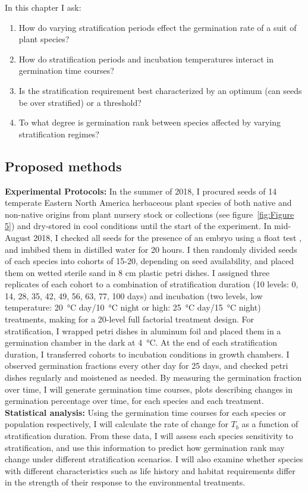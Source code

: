 \documentclass[12pt]{article}\usepackage[]{graphicx}\usepackage[]{color}
\begin{document}
\indent In this chapter I ask:
\begin{enumerate}
\item How do varying stratification periods effect the germination rate of a suit of plant species? 
\item How do stratification periods and incubation temperatures interact in germination time courses?
\item Is the stratification requirement best characterized by an optimum (can seeds be over stratified) or a threshold?
\item To what degree is germination rank between species affected by varying stratification regimes?
\end{enumerate}
\subsection*{Proposed methods}
\indent\indent\textbf{Experimental Protocols:} In the summer of 2018, I procured seeds of 14 temperate Eastern North America herbaceous plant species of both native and non-native origins from plant nursery stock or collections (see figure~\ref{fig:Figure 5}) and dry-stored in cool conditions until the start of the experiment. In mid-August 2018, I checked all seeds for the presence of an embryo using a float test \citep{Baskin2014}, and imbibed them in distilled water for 20 hours. I then randomly divided seeds of each species into cohorts of 15-20, depending on seed availability, and placed them on wetted sterile sand in 8 cm plastic petri dishes. I assigned three replicates of each cohort to a combination of stratification duration (10 levels: 0, 14, 28, 35, 42, 49, 56, 63, 77, 100 days) and incubation (two levels, low temperature: \SI{20}{\degreeCelsius} day/\SI{10}{\degreeCelsius} night or high: \SI{25}{\degreeCelsius} day/\SI{15}{\degreeCelsius} night) treatments, making for a 20-level full factorial treatment design. For stratification, I wrapped petri dishes in aluminum foil and placed them in a germination chamber in the dark at \SI{4}{\degreeCelsius}. At the end of each stratification duration, I transferred cohorts to incubation conditions in growth chambers. I observed germination fractions every other day for 25 days, and checked petri dishes regularly and moistened as needed. By measuring the germination fraction over time, I will generate germination time courses, plots describing changes in germination percentage over time, for each species and each treatment.\\
\indent\textbf{Statistical analysis:} Using the germination time courses for each species or population respectively, I will calculate the rate of change for $T_b$ as a function of stratification duration. From these data, I will assess each species sensitivity to stratification, and use this information to predict how germination rank may change under different stratification scenarios. I will also examine whether species with different characteristics such as life history and habitat requirements differ in the strength of their response to the environmental treatments.\\
\end{document}

